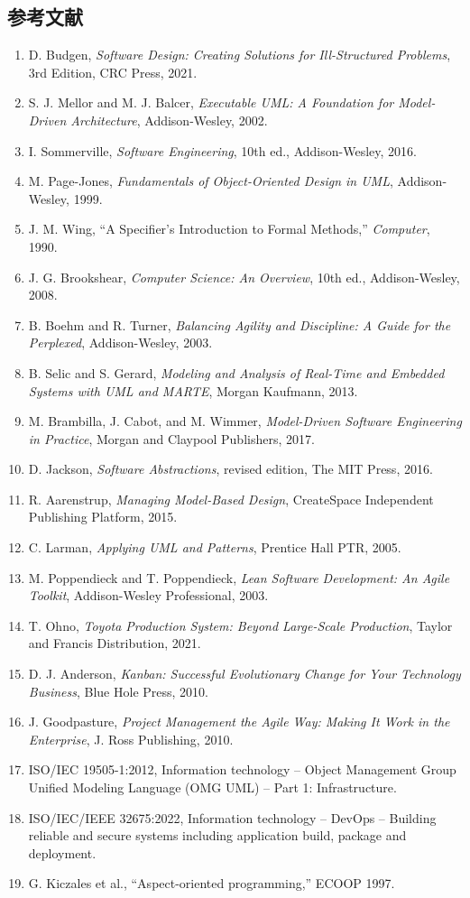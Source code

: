 \subsection{参考文献}
\begin{enumerate}
  \item D. Budgen, \textit{Software Design: Creating Solutions for Ill-Structured Problems}, 3rd Edition, CRC Press, 2021.
  \item S. J. Mellor and M. J. Balcer, \textit{Executable UML: A Foundation for Model-Driven Architecture}, Addison-Wesley, 2002.
  \item I. Sommerville, \textit{Software Engineering}, 10th ed., Addison-Wesley, 2016.
  \item M. Page-Jones, \textit{Fundamentals of Object-Oriented Design in UML}, Addison-Wesley, 1999.
  \item J. M. Wing, ``A Specifier's Introduction to Formal Methods,'' \textit{Computer}, 1990.
  \item J. G. Brookshear, \textit{Computer Science: An Overview}, 10th ed., Addison-Wesley, 2008.
  \item B. Boehm and R. Turner, \textit{Balancing Agility and Discipline: A Guide for the Perplexed}, Addison-Wesley, 2003.
  \item B. Selic and S. Gerard, \textit{Modeling and Analysis of Real-Time and Embedded Systems with UML and MARTE}, Morgan Kaufmann, 2013.
  \item M. Brambilla, J. Cabot, and M. Wimmer, \textit{Model-Driven Software Engineering in Practice}, Morgan and Claypool Publishers, 2017.
  \item D. Jackson, \textit{Software Abstractions}, revised edition, The MIT Press, 2016.
  \item R. Aarenstrup, \textit{Managing Model-Based Design}, CreateSpace Independent Publishing Platform, 2015.
  \item C. Larman, \textit{Applying UML and Patterns}, Prentice Hall PTR, 2005.
  \item M. Poppendieck and T. Poppendieck, \textit{Lean Software Development: An Agile Toolkit}, Addison-Wesley Professional, 2003.
  \item T. Ohno, \textit{Toyota Production System: Beyond Large-Scale Production}, Taylor and Francis Distribution, 2021.
  \item D. J. Anderson, \textit{Kanban: Successful Evolutionary Change for Your Technology Business}, Blue Hole Press, 2010.
  \item J. Goodpasture, \textit{Project Management the Agile Way: Making It Work in the Enterprise}, J. Ross Publishing, 2010.
  \item ISO/IEC 19505-1:2012, Information technology -- Object Management Group Unified Modeling Language (OMG UML) -- Part 1: Infrastructure.
  \item ISO/IEC/IEEE 32675:2022, Information technology -- DevOps -- Building reliable and secure systems including application build, package and deployment.
  \item G. Kiczales et al., ``Aspect-oriented programming,'' ECOOP 1997.
\end{enumerate}

